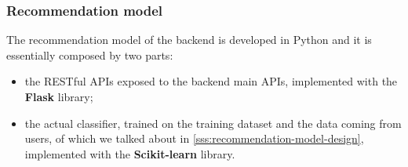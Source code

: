 \documentclass[../../main]{subfiles}
\begin{document}
\subsubsection{Recommendation model}
\label{sss:recommendation-model-development}

The recommendation model of the backend is developed in Python and it is essentially composed by two parts:
\begin{itemize}
    \item the RESTful APIs exposed to the backend main APIs, implemented with the \textbf{Flask} library;
    \item the actual classifier, trained on the training dataset and the data coming from users, of which we talked about in \ref{sss:recommendation-model-design}, implemented with the \textbf{Scikit-learn} library.
\end{itemize}

\end{document}
